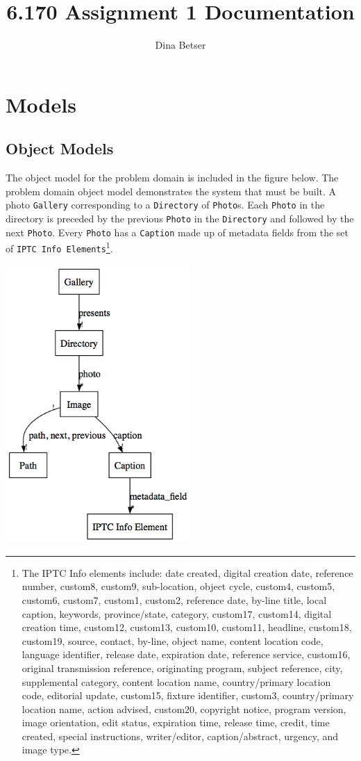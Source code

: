 \documentclass[11pt,letterpaper]{article}
\title{6.170 Assignment 1 Documentation}
\author{Dina Betser}
\begin{document}
\maketitle

\section{Models}
\subsection{Object Models}
The object model for the problem domain is included in the figure below. The problem domain object model demonstrates the system that must be built. A photo \texttt{Gallery} corresponding to a \texttt{Directory} of \texttt{Photo}s. Each \texttt{Photo} in the directory is preceded by the previous \texttt{Photo} in the \texttt{Directory} and followed by the next \texttt{Photo}. Every \texttt{Photo} has a \texttt{Caption} made up of metadata fields from the set of \texttt{IPTC Info Elements}\footnote{The IPTC Info elements include: date created, digital creation date, reference number, custom8, custom9, sub-location, object cycle, custom4, custom5, custom6, custom7, custom1, custom2, reference date, by-line title, local caption, keywords, province/state, category, custom17, custom14, digital creation time, custom12, custom13, custom10, custom11, headline, custom18, custom19, source, contact, by-line, object name, content location code, language identifier, release date, expiration date, reference service, custom16, original transmission reference, originating program, subject reference, city, supplemental category, content location name, country/primary location code, editorial update, custom15, fixture identifier, custom3, country/primary location name, action advised, custom20, copyright notice, program version, image orientation, edit status, expiration time, release time, credit, time created, special instructions, writer/editor, caption/abstract, urgency, and image type.}.
\begin{center}
\includegraphics[width=200pt]{dot/obmod.png}
\label{fig:ob1} 
\end{center}
\end{document}
